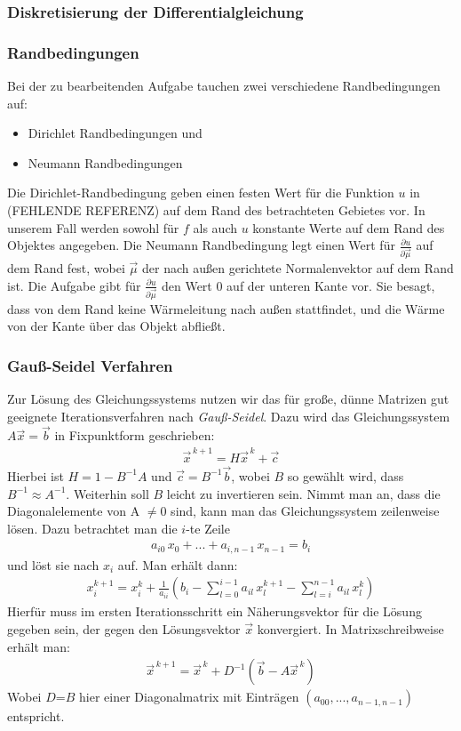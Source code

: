 \documentclass[10pt,a4paper]{article}
\begin{document}
\subsubsection{Diskretisierung der Differentialgleichung}


\subsubsection{Randbedingungen}
\label{randbedingungen}
Bei der zu bearbeitenden Aufgabe tauchen zwei verschiedene Randbedingungen auf:
\begin{itemize}
\item Dirichlet Randbedingungen und
\item Neumann Randbedingungen
\end{itemize}
Die Dirichlet-Randbedingung geben einen festen Wert für die Funktion $u$ in (FEHLENDE REFERENZ) auf dem Rand des betrachteten Gebietes vor. In unserem Fall werden sowohl für $f$ als auch $u$ konstante Werte auf dem Rand des Objektes angegeben. Die Neumann Randbedingung legt einen Wert für $\frac{\partial u}{\partial \vec{\mu}}$ auf dem Rand fest, wobei $\vec{\mu}$ der nach außen gerichtete Normalenvektor auf dem Rand ist. Die Aufgabe gibt für $\frac{\partial u}{\partial \vec{\mu}}$ den Wert $0$ auf der unteren Kante vor. Sie besagt, dass von dem Rand keine Wärmeleitung nach außen stattfindet, und die Wärme von der Kante über das Objekt abfließt.

\subsubsection{Gauß-Seidel Verfahren}
\label{sec:gauss-seidel}
Zur Lösung des Gleichungssystems nutzen wir das für große, dünne Matrizen gut geeignete Iterationsverfahren nach \emph{Gauß-Seidel}. Dazu wird das Gleichungssystem $A\vec{x}=\vec{b}$ in Fixpunktform geschrieben:
\begin{align}
\vec{x}^{\,k+1}=H\vec{x}^{\,k}+\vec{c}
\end{align}
Hierbei ist $H=1-B^{-1}A$ und $\vec{c}=B^{-1}\vec{b}$, wobei $B$ so gewählt wird, dass $B^{-1}\approx A^{-1}$. Weiterhin soll $B$ leicht zu invertieren sein. Nimmt man an, dass die Diagonalelemente von A $\not=0$ sind, kann man das Gleichungssystem zeilenweise lösen. Dazu betrachtet man die $i$-te Zeile
\begin{align}
a_{i0}\,x_0+...+a_{i,n-1}\,x_{n-1}=b_i
\end{align}
und löst sie nach $x_i$ auf. Man erhält dann:
\begin{align}
x_i^{k+1}=x^k_i+\frac{1}{a_{ii}}\left( b_i-\sum_{l=0}^{i-1}a_{il}\,x_l^{k+1} - \sum_{l=i}^{n-1}a_{il}\,x_l^k\right)
\end{align}
Hierfür muss im ersten Iterationsschritt ein Näherungsvektor für die Lösung gegeben sein, der gegen den Lösungsvektor $\vec{x}$ konvergiert. In Matrixschreibweise erhält man:
\begin{align}
\vec{x}^{\,k+1}=\vec{x}^{\,k}+D^{-1}\left(\vec{b}-A\vec{x}^{\,k}\right)
\end{align}
Wobei $D$=$B$ hier einer Diagonalmatrix mit Einträgen $(a_{00}, ... ,a_{n-1,n-1})$ entspricht.
\end{document}
